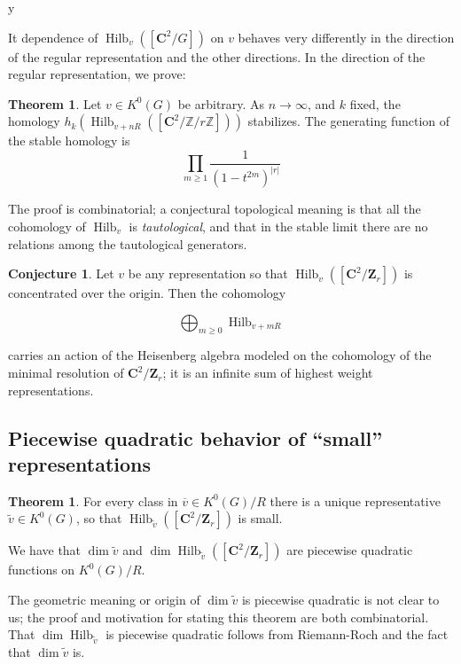y\documentclass{amsart}[12pt]
\theoremstyle{definition}
\newtheorem{theorem}[dummy]{Theorem}
\newtheorem{conjecture}[dummy]{Conjecture}
\newcommand{\Z}{\mathbf{Z}}
\newcommand{\C}{\mathbf{C}}
\DeclareMathOperator{\Hilb}{Hilb}
\begin{document}
It dependence of $\Hilb_v([\C^2/G])$ on $v$ behaves very differently in the direction of the regular representation and the other directions.  In the direction of the regular representation, we prove:

\begin{theorem}
Let $v\in K^0(G)$ be arbitrary.  As $n\to \infty$, and $k$ fixed, the homology $h_k(\Hilb_{v+nR}([\C^2/\mathbb{Z}/r\mathbb{Z}]))$ stabilizes.  The generating function of the stable homology is
$$\prod_{m\geq 1} \frac{1}{(1-t^{2m})^{|r|}}$$
\end{theorem}

The proof is combinatorial; a conjectural topological meaning is that all the cohomology of $\Hilb_v$ is \emph{tautological}, and that in the stable limit there are no relations among the tautological generators.



\begin{conjecture}
Let $v$ be any representation so that $\Hilb_v([\C^2/\Z_r])$ is concentrated over the origin.  Then the cohomology

$$\bigoplus_{m\geq 0} \Hilb_{v+mR} $$ 

carries an action of the Heisenberg algebra modeled on the cohomology of the minimal resolution of $\C^2/\Z_r$; it is an infinite sum of highest weight representations.

\end{conjecture}

\subsection{Piecewise quadratic behavior of ``small'' representations}


\begin{theorem}
For every class in $\overline{v}\in K^0(G)/R$ there is a unique representative $\tilde{v}\in K^0(G)$, so that $\Hilb_{\tilde{v}}([\C^2/\Z_r])$ is small.  

We have that $\dim \tilde{v}$ and $\dim \Hilb_{\tilde{v}}([\C^2/\Z_r])$ are piecewise quadratic functions on $K^0(G)/R$.
\end{theorem}

The geometric meaning or origin of $\dim \tilde{v}$ is piecewise quadratic is not clear to us; the proof and motivation for stating this theorem are both combinatorial.  That $\dim \Hilb_{\tilde{v}}$ is piecewise quadratic follows from Riemann-Roch and the fact that $\dim \tilde{v}$ is.    
\end{document}
